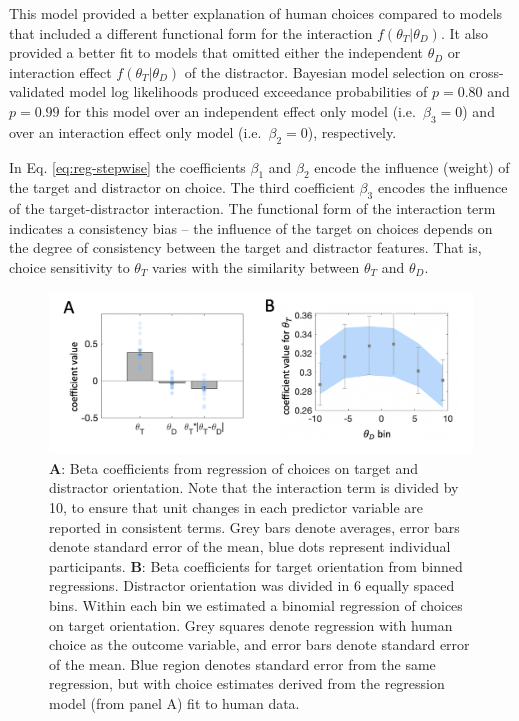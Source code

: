 \documentclass[a4paper, nobind]{templates/ociamthesis}
\begin{document}
This model provided a better explanation of human choices compared to models that included a different functional form for the interaction \(f(\theta_T|\theta_D)\). It also provided a better fit to models that omitted either the independent \(\theta_D\) or interaction effect \(f(\theta_T|\theta_D)\) of the distractor. Bayesian model selection on cross-validated model log likelihoods produced exceedance probabilities of \(p=0.80\) and \(p=0.99\) for this model over an independent effect only model (i.e.~\(\beta_3=0\)) and over an interaction effect only model (i.e.~\(\beta_2=0\)), respectively.

In Eq. \eqref{eq:reg-stepwise} the coefficients \(\beta_1\) and \(\beta_2\) encode the influence (weight) of the target and distractor on choice. The third coefficient \(\beta_3\) encodes the influence of the target-distractor interaction. The functional form of the interaction term indicates a consistency bias -- the influence of the target on choices depends on the degree of consistency between the target and distractor features. That is, choice sensitivity to \(\theta_T\) varies with the similarity between \(\theta_T\) and \(\theta_D\).

\begin{figure}

{\centering \includegraphics[width=1\linewidth]{figures/distr-regr-a} 

}

\caption[Experiment 1, Regression results]{$\textbf{A:}$ Beta coefficients from regression of choices on target and distractor orientation. Note that the interaction term is divided by 10, to ensure that unit changes in each predictor variable are reported in consistent terms. Grey bars denote averages, error bars denote standard error of the mean, blue dots represent individual participants. $\textbf{B:}$ Beta coefficients for target orientation from binned regressions. Distractor orientation was divided in 6 equally spaced bins. Within each bin we estimated a binomial regression of choices on target orientation. Grey squares denote regression with human choice as the outcome variable, and error bars denote standard error of the mean. Blue region denotes standard error from the same regression, but with choice estimates derived from the regression model (from panel A) fit to human data.}\label{fig:distr-regr-a}
\end{figure}
\end{document}
